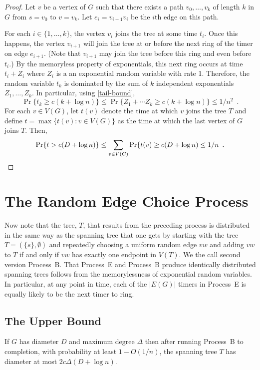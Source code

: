 \documentclass{patmorin}
\begin{document}
\begin{proof}
  Let $v$ be a vertex of $G$ such that there exists a path
  $v_0,\ldots,v_k$ of length $k$ in $G$ from $s=v_0$ to $v=v_k$.
  Let $e_i=v_{i-1}v_i$ be the $i$th edge on this path.

  For each $i\in\{1,\ldots,k\}$, the vertex $v_i$ joins the tree at some
  time $t_i$.  Once this happens, the vertex $v_{i+1}$ will join the tree
  at or before the next ring of the timer on edge $e_{i+1}$.  (Note that
  $v_{i+1}$ may join the tree before this ring and even before $t_i$.)
  By the memoryless property of exponentials, this next ring occurs at
  time $t_i+Z_i$ where $Z_i$ is a an exponential random variable with
  rate 1.  Therefore, the random variable $t_k$ is dominated by the sum
  of $k$ independent exponentials $Z_1,\ldots,Z_k$.
  In particular, using \eqref{tail-bound},
  \[
      \Pr\{t_k\ge c(k+\log n)\} \le \Pr\{Z_1+\cdots Z_k\ge c(k+\log n)\} \le 1/n^2 \enspace .
  \]
  For each $v\in V(G)$, let $t(v)$ denote the time at which $v$ joins
  the tree $T$ and define $t=\max\{t(v):v\in V(G)\}$
  as the time at which the last vertex of $G$ joins 
  $T$.  Then,
  \[
      \Pr\{t> c(D+\log n)\} \le \sum_{v\in V(G)}\Pr\{t(v) \ge c(D+\log n)     
       \le 1/n \enspace . \qedhere
  \]
\end{proof}

\section{The Random Edge Choice Process}

Now note that the tree, $T$, that results from the preceding process
is distributed in the same way as the spanning tree that one gets by
starting with the tree $T=(\{s\},\emptyset)$ and repeatedly choosing
a uniform random edge $vw$ and adding $vw$ to $T$ if and only if $vw$
has exactly one endpoint in $V(T)$.  We the call second version Process~B.
That Process~E and Process~B produce identically distributed spanning
trees follows from the memorylessness of exponential random variables.
In particular, at any point in time, each of the $|E(G)|$ timers in
Process~E is equally likely to be the next timer to ring.

\subsection{The Upper Bound}

\begin{lem}
  If $G$ has diameter $D$ and maximum degree $\Delta$ then after running
  Process~B to completion, with probability at least $1-O(1/n)$, the spanning
  tree $T$ has diameter at most $2c\Delta(D+\log n)$.
\end{lem}
\end{document}
